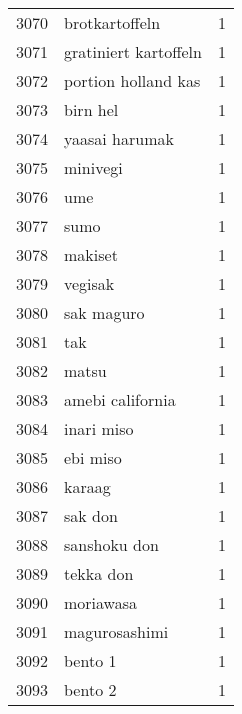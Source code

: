 \begin{tabular}{llr}
3070 &                                     brotkartoffeln &      1 \\
3071 &                              gratiniert kartoffeln &      1 \\
3072 &                                portion holland kas &      1 \\
3073 &                                           birn hel &      1 \\
3074 &                                     yaasai harumak &      1 \\
3075 &                                           minivegi &      1 \\
3076 &                                                ume &      1 \\
3077 &                                               sumo &      1 \\
3078 &                                            makiset &      1 \\
3079 &                                            vegisak &      1 \\
3080 &                                         sak maguro &      1 \\
3081 &                                                tak &      1 \\
3082 &                                              matsu &      1 \\
3083 &                                   amebi california &      1 \\
3084 &                                         inari miso &      1 \\
3085 &                                           ebi miso &      1 \\
3086 &                                             karaag &      1 \\
3087 &                                            sak don &      1 \\
3088 &                                       sanshoku don &      1 \\
3089 &                                          tekka don &      1 \\
3090 &                                          moriawasa &      1 \\
3091 &                                      magurosashimi &      1 \\
3092 &                                            bento 1 &      1 \\
3093 &                                            bento 2 &      1 \\

\end{tabular}

